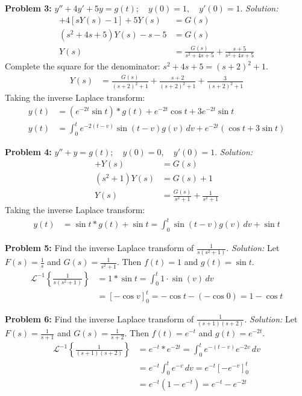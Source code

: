 \documentclass[11pt, letterpaper]{article}
\theoremstyle{definition}
\theoremstyle{remark}
\begin{document}
\textbf{Problem 3:} $y'' + 4y' + 5y = g(t); \quad y(0) = 1, \quad y'(0) = 1$.
\textit{Solution:}
\begin{align*}
[s^2Y(s) - s - 1] + 4[sY(s) - 1] + 5Y(s) &= G(s) \\[4pt]
(s^2 + 4s + 5)Y(s) - s - 5 &= G(s) \\[4pt]
Y(s) &= \frac{G(s)}{s^2+4s+5} + \frac{s+5}{s^2+4s+5}
\end{align*}
Complete the square for the denominator: $s^2+4s+5 = (s+2)^2 + 1$.
\begin{align*}
Y(s) &= \frac{G(s)}{(s+2)^2+1} + \frac{s+2}{(s+2)^2+1} + \frac{3}{(s+2)^2+1}
\end{align*}
Taking the inverse Laplace transform:
\begin{align*}
y(t) &= (e^{-2t}\sin t) * g(t) + e^{-2t}\cos t + 3e^{-2t}\sin t \\[4pt]
y(t) &= \int_0^t e^{-2(t-v)}\sin(t-v)g(v) \, dv + e^{-2t}(\cos t + 3\sin t)
\end{align*}

\textbf{Problem 4:} $y'' + y = g(t); \quad y(0) = 0, \quad y'(0) = 1$.
\textit{Solution:}
\begin{align*}
[s^2Y(s) - 1] + Y(s) &= G(s) \\[4pt]
(s^2 + 1)Y(s) &= G(s) + 1 \\[4pt]
Y(s) &= \frac{G(s)}{s^2+1} + \frac{1}{s^2+1}
\end{align*}
Taking the inverse Laplace transform:
\begin{align*}
y(t) &= \sin t * g(t) + \sin t = \int_0^t \sin(t-v)g(v) \, dv + \sin t
\end{align*}

\textbf{Problem 5:} Find the inverse Laplace transform of $\frac{1}{s(s^2+1)}$.
\textit{Solution:}
Let $F(s) = \frac{1}{s}$ and $G(s) = \frac{1}{s^2+1}$. Then $f(t) = 1$ and $g(t) = \sin t$.
\begin{align*}
\mathscr{L}^{-1}\left\{\frac{1}{s(s^2+1)}\right\} &= 1 * \sin t = \int_0^t 1 \cdot \sin(v) \, dv \\[4pt]
&= \left[ -\cos v \right]_0^t = -\cos t - (-\cos 0) = 1 - \cos t
\end{align*}

\textbf{Problem 6:} Find the inverse Laplace transform of $\frac{1}{(s+1)(s+2)}$.
\textit{Solution:}
Let $F(s) = \frac{1}{s+1}$ and $G(s) = \frac{1}{s+2}$. Then $f(t) = e^{-t}$ and $g(t) = e^{-2t}$.
\begin{align*}
\mathscr{L}^{-1}\left\{\frac{1}{(s+1)(s+2)}\right\} &= e^{-t} * e^{-2t} = \int_0^t e^{-(t-v)}e^{-2v} \, dv \\[4pt]
&= e^{-t} \int_0^t e^{-v} \, dv = e^{-t} \left[ -e^{-v} \right]_0^t \\[4pt]
&= e^{-t}(1 - e^{-t}) = e^{-t} - e^{-2t}
\end{align*}
\end{document}
